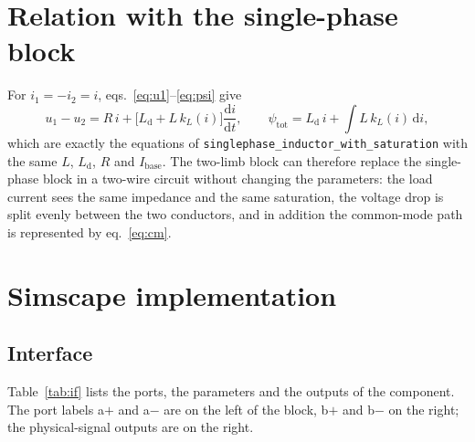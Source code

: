 \documentclass[11pt,a4paper]{article}
\begin{document}
\section{Relation with the single-phase block}
\label{sec:equiv}

For $i_1 = -i_2 = i$, eqs.~\eqref{eq:u1}--\eqref{eq:psi} give
\begin{equation}
  u_1 - u_2 = R\, i + \bigl[L_\mathrm{d} + L\, k_L(i)\bigr] \frac{\mathrm{d}i}{\mathrm{d}t},
  \qquad
  \psi_\mathrm{tot} = L_\mathrm{d}\, i + \int L\, k_L(i)\, \mathrm{d}i ,
\end{equation}
which are exactly the equations of \texttt{singlephase\_inductor\_with\_saturation}
with the same $L$, $L_\mathrm{d}$, $R$ and $I_\mathrm{base}$. The two-limb block can
therefore replace the single-phase block in a two-wire circuit without changing the
parameters: the load current sees the same impedance and the same saturation, the
voltage drop is split evenly between the two conductors, and in addition the
common-mode path is represented by eq.~\eqref{eq:cm}.

\section{Simscape implementation}
\label{sec:impl}

\subsection{Interface}

Table~\ref{tab:if} lists the ports, the parameters and the outputs of the component.
The port labels a$+$ and a$-$ are on the left of the block, b$+$ and b$-$ on the right;
the physical-signal outputs are on the right.
\end{document}
